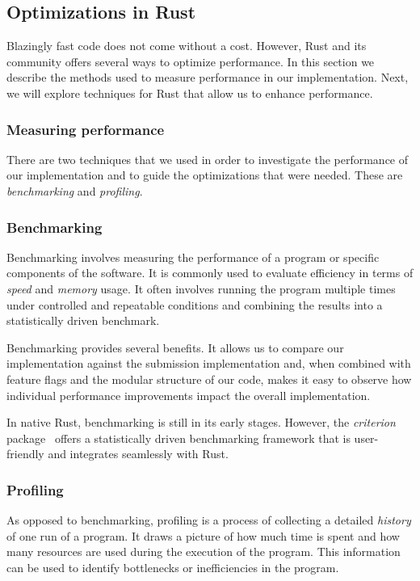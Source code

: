 \documentclass[11pt]{report}
\theoremstyle{definition}
\theoremstyle{plain}
\begin{document}
\subsection{Optimizations in Rust}\label{sub:rust_optimizations}
Blazingly fast code does not come without a cost. However, Rust and its community offers several ways to optimize performance. In this section we describe the methods used to measure performance in our implementation. Next, we will explore techniques for Rust that allow us to enhance performance.

\subsubsection*{Measuring performance}\label{sec:rust_benchmarking}
There are two techniques that we used in order to investigate the performance of our implementation and  to guide the optimizations that were needed. These are \textit{benchmarking} and \textit{profiling}.

\subsubsection{Benchmarking}
Benchmarking involves measuring the performance of a program or specific components of the software. It is commonly used to evaluate efficiency in terms of \textit{speed} and \textit{memory} usage. It often involves running the program multiple times under controlled and repeatable conditions and combining the results into a statistically driven benchmark.

Benchmarking provides several benefits. It allows us to compare our implementation against the submission implementation and, when combined with feature flags and the modular structure of our code, makes it easy to observe how individual performance improvements impact the overall implementation.

In native Rust, benchmarking is still in its early stages. However, the \textit{criterion} package~\cite{criterion} offers a statistically driven benchmarking framework that is user-friendly and integrates seamlessly with Rust.

\subsubsection{Profiling}\label{ch:prelim:sec:rust:sub:profiling}
As opposed to benchmarking, profiling is a process of collecting a detailed \textit{history} of one run of a program. It draws a picture of how much time is spent and how many resources are used during the execution of the program. This information can be used to identify bottlenecks or inefficiencies in the program.
\end{document}
